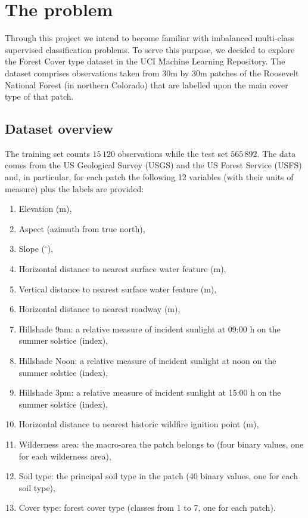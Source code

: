 \chapter{The problem}
Through this project we intend to become familiar with imbalanced multi-class supervised classification problems. To serve this purpose, we decided to explore the Forest Cover type dataset in the UCI Machine Learning Repository. The dataset comprises observations taken from 30m by 30m patches of the Roosevelt National Forest (in northern Colorado) that are labelled upon the main cover type of that patch.
\section{Dataset overview}
The training set counts $15\,120$ observations while the test set $565\,892$. The data comes from the US Geological Survey
(USGS) and the US Forest Service (USFS) and, in particular, for each patch the following 12 variables (with their units of measure) plus the labels are provided:
\begin{enumerate}
	\item Elevation (m),
	\item Aspect (azimuth from true north),
	\item Slope ($^{\circ}$),
	\item Horizontal distance to nearest surface water feature (m),
	\item Vertical distance to nearest surface water feature (m),
	\item Horizontal distance to nearest roadway (m),
	\item Hillshade 9am: a relative measure of incident sunlight at 09:00 h on the summer solstice (index),
	\item Hillshade Noon: a relative measure of incident sunlight at noon on the summer solstice (index),
	\item Hillshade 3pm: a relative measure of incident sunlight at 15:00 h on the summer solstice (index),
	\item Horizontal distance to nearest historic wildfire ignition point (m),
	\item Wilderness area: the macro-area the patch belongs to (four binary values, one for each wilderness area),
	\item Soil type: the principal soil type in the patch (40 binary values, one for each soil type),
	\item Cover type: forest cover type (classes from 1 to 7, one for each patch).
\end{enumerate}
